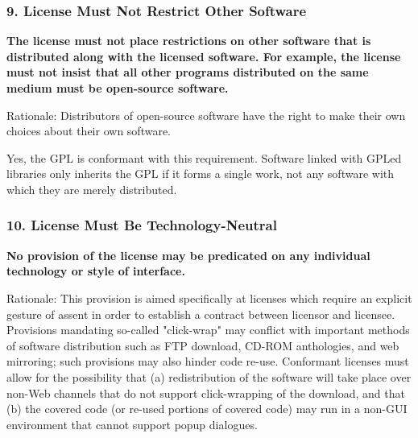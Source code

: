 
\begin{frame}
\frametitle{9. License Must Not Restrict Other Software}

{\bf
The license must not place restrictions on other software that is
distributed along with the licensed software. For example, the license
must not insist that all other programs distributed on the same medium
must be open-source software.}

\vspace{.2cm}
Rationale: Distributors of open-source software have the right to make
their own choices about their own software.

Yes, the GPL is conformant with this requirement. Software linked with
GPLed libraries only inherits the GPL if it forms a single work, not
any software with which they are merely distributed.

\end{frame}


\begin{frame}
\frametitle{10. License Must Be Technology-Neutral}

{\bf
No provision of the license may be predicated on any individual
technology or style of interface.}

\vspace{.2cm}
Rationale: This provision is aimed specifically at licenses
which require an explicit gesture of assent in order to establish a
contract between licensor and licensee. Provisions mandating so-called
"click-wrap" may conflict with important methods of software
distribution such as FTP download, CD-ROM anthologies, and web
mirroring; such provisions may also hinder code re-use. Conformant
licenses must allow for the possibility that (a) redistribution of the
software will take place over non-Web channels that do not support
click-wrapping of the download, and that (b) the covered code (or
re-used portions of covered code) may run in a non-GUI environment
that cannot support popup dialogues.

\end{frame}
